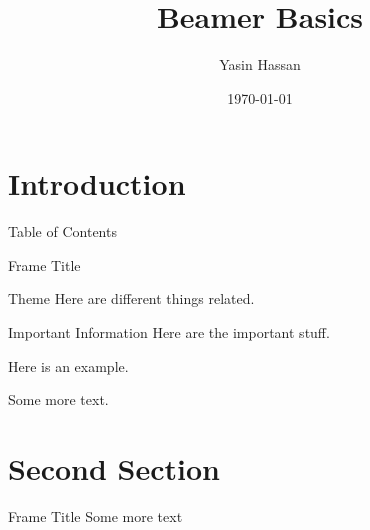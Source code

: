 \documentclass{beamer}
\title{Beamer Basics}
\author{Yasin Hassan}
\date{\today}
\institute{George Mason University}
\begin{document}
\maketitle

\section{Introduction}
\begin{frame}{Table of Contents}
    \tableofcontents
\end{frame}

\begin{frame}{Frame Title}
    \begin{block}{Theme}
    Here are different things \alert{related}.
    \end{block}\pause
    \begin{alertblock}{Important Information}
    Here are the important stuff.
    \end{alertblock}\pause
    \begin{example}
    Here is an example.
    \end{example}\pause
    Some more text.
\end{frame}

\section{Second Section}
\begin{frame}{Frame Title}
    Some more text
\end{frame}
\end{document}
